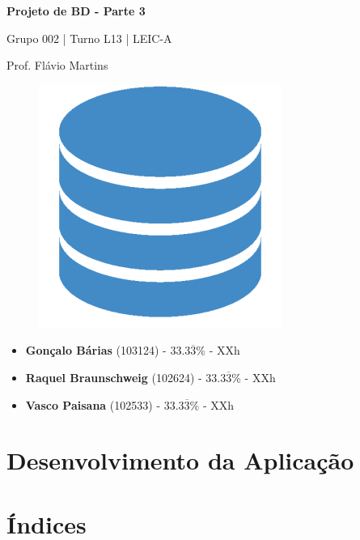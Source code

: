 \documentclass[12pt,a4paper]{article}
\begin{document}
\begin{titlepage}
  \begin{center}
    \vspace*{5cm}
    \Huge
    \textbf{Projeto de BD - Parte 3}

    \vspace{0.5cm}
    \LARGE
    Grupo 002 | Turno L13 | LEIC-A

    \vspace{0.5cm}
    \large
    Prof. Flávio Martins

    \vspace{0.5cm}
    \begin{figure}[h]
      \centering
      \includegraphics[scale=0.5]{report_logo.png}
    \end{figure}

    \vfill
    \large
    \begin{minipage}{0.8\textwidth}
      \begin{itemize}
        \item[] \textbf{Gonçalo Bárias} (103124) - 33.3$\overline{3}$\% - XXh
        \item[] \textbf{Raquel Braunschweig} (102624) - 33.3$\overline{3}$\% - XXh
        \item[] \textbf{Vasco Paisana} (102533) - 33.3$\overline{3}$\% - XXh
      \end{itemize}
    \end{minipage}
  \end{center}
\end{titlepage}

\section*{Desenvolvimento da Aplicação}

\section*{Índices}
\end{document}
